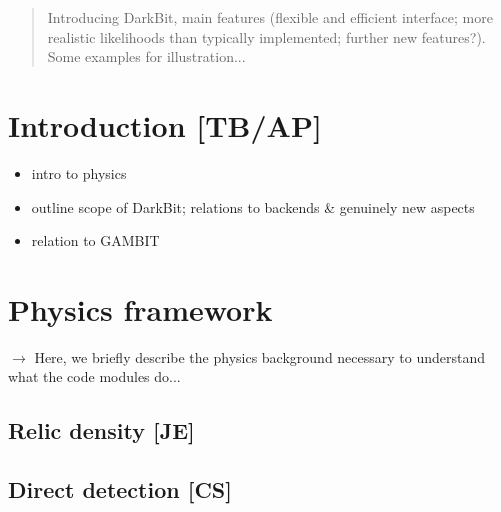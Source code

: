 \date{\today}


\maketitle

\begin{abstract}

Introducing DarkBit, main features (flexible and efficient interface; more realistic likelihoods
than typically implemented; further new features?). 
Some examples for illustration...

\end{abstract}

\section{Introduction [TB/AP]}
\label{intro}

\begin{itemize}
\item intro to physics
\item outline scope of DarkBit; relations to backends \& genuinely new aspects
\item relation to GAMBIT
\end{itemize}


\section{Physics framework}
\label{phys}

$\to$ Here, we briefly describe the physics background necessary to understand what the code modules do...

\subsection{Relic density {\bf [JE]}}
\label{phys_rd}

\subsection{Direct detection {\bf [CS]}}
\label{phys_dd}

